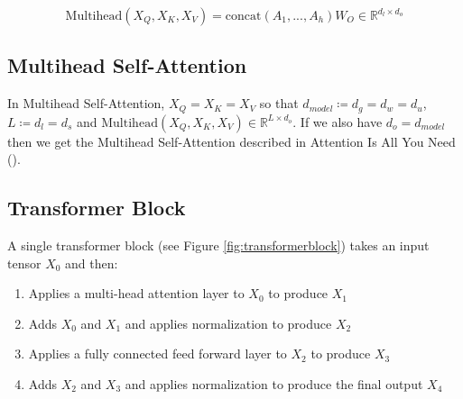 \documentclass[11pt]{article}
\theoremstyle{definition}
\begin{document}
\begin{equation}
\mathrm{Multihead}\left(X_Q, X_K, X_V \right) =
\mathrm{concat} \left( A_1, ... , A_h \right)W_O
\in \mathbb{R}^{d_l \times d_o}
\end{equation}

\subsection{Multihead Self-Attention}

In Multihead Self-Attention, $X_Q = X_K = X_V$ so that $d_{model} \coloneqq d_g = d_w = d_u$, $L \coloneqq d_l = d_s$ and $\mathrm{Multihead}\left(X_Q, X_K, X_V \right) \in \mathbb{R}^{L \times d_o}$. If we also have $d_o = d_{model}$ then we get the Multihead Self-Attention described in Attention Is All You Need (\cite{vaswani2017attention}).

\subsection{Transformer Block}

A single transformer block (see Figure \ref{fig:transformerblock}) takes an input tensor $X_0$ and then:
\begin{enumerate}
\item Applies a multi-head attention layer to $X_0$ to produce $X_1$
\item Adds $X_0$ and $X_1$ and applies normalization to produce $X_2$
\item Applies a fully connected feed forward layer to $X_2$ to produce $X_3$
\item Adds $X_2$ and $X_3$ and applies normalization to produce the final output $X_4$
\end{enumerate}
\end{document}
